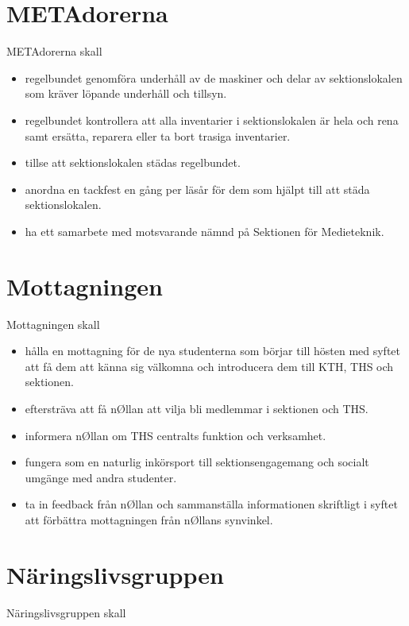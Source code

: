 \documentclass{dgovdoc}
\begin{document}
\section{METAdorerna}

METAdorerna skall

\begin{itemize}
\item regelbundet genomföra underhåll av de maskiner och delar av
  sektionslokalen som kräver löpande underhåll och tillsyn.
\item regelbundet kontrollera att alla inventarier i sektionslokalen är hela
  och rena samt ersätta, reparera eller ta bort trasiga inventarier.
\item tillse att sektionslokalen städas regelbundet.
\item anordna en tackfest en gång per läsår för dem som hjälpt till att städa
  sektionslokalen.
\item ha ett samarbete med motsvarande nämnd på Sektionen för Medieteknik.
\end{itemize}

\section{Mottagningen}

Mottagningen skall

\begin{itemize}
\item hålla en mottagning för de nya studenterna som börjar till hösten med
  syftet att få dem att känna sig välkomna och introducera dem till KTH, THS och
  sektionen.
\item eftersträva att få nØllan att vilja bli medlemmar i sektionen och THS.
\item informera nØllan om THS centralts funktion och verksamhet.
\item fungera som en naturlig inkörsport till sektionsengagemang och socialt
  umgänge med andra studenter.
\item ta in feedback från nØllan och sammanställa informationen skriftligt i
  syftet att förbättra mottagningen från nØllans synvinkel.
\end{itemize}

\section{Näringslivsgruppen}

Näringslivsgruppen skall
\end{document}
